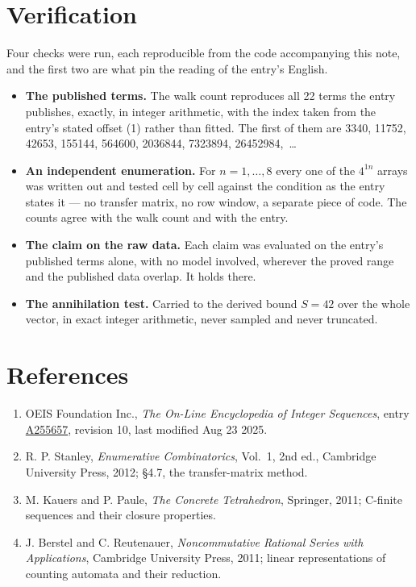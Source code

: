 \documentclass[11pt]{article}
\theoremstyle{definition}
\begin{document}
\section{Verification}

Four checks were run, each reproducible from the code accompanying this note, and the first two are what pin the reading of the entry's English.

\begin{itemize}

\item {\bfseries The published terms.} The walk count reproduces all 22 terms the entry publishes, exactly, in integer arithmetic, with the index taken from the entry's stated offset (1) rather than fitted. The first of them are 3340, 11752, 42653, 155144, 564600, 2036844, 7323894, 26452984,~\dots

\item {\bfseries An independent enumeration.} For $n = 1,\dots,8$ every one of the $4^{1n}$ arrays was written out and tested cell by cell against the condition as the entry states it --- no transfer matrix, no row window, a separate piece of code. The counts agree with the walk count and with the entry.

\item {\bfseries The claim on the raw data.} Each claim was evaluated on the entry's published terms alone, with no model involved, wherever the proved range and the published data overlap. It holds there.

\item {\bfseries The annihilation test.} Carried to the derived bound $S = 42$ over the whole vector, in exact integer arithmetic, never sampled and never truncated.

\end{itemize}

\section{References}

\begin{enumerate}

\item OEIS Foundation Inc., \emph{The On-Line Encyclopedia of Integer Sequences}, entry \href{https://oeis.org/A255657}{A255657}, revision 10, last modified Aug 23 2025.

\item R. P. Stanley, \emph{Enumerative Combinatorics}, Vol.~1, 2nd ed., Cambridge University Press, 2012; \S4.7, the transfer-matrix method.

\item M. Kauers and P. Paule, \emph{The Concrete Tetrahedron}, Springer, 2011; C-finite sequences and their closure properties.

\item J. Berstel and C. Reutenauer, \emph{Noncommutative Rational Series with Applications}, Cambridge University Press, 2011; linear representations of counting automata and their reduction.

\end{enumerate}
\end{document}
